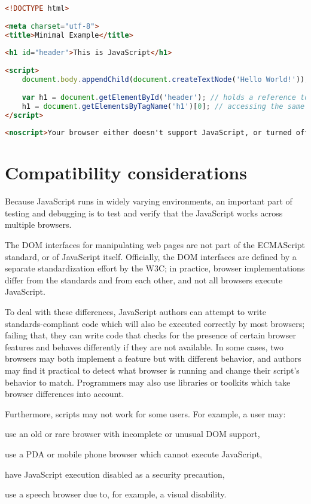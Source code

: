 \begin{lstlisting}[language=HTML]
<!DOCTYPE html>
 
<meta charset="utf-8">
<title>Minimal Example</title>
 
<h1 id="header">This is JavaScript</h1>
 
<script>
    document.body.appendChild(document.createTextNode('Hello World!'));
 
    var h1 = document.getElementById('header'); // holds a reference to the <h1> tag
    h1 = document.getElementsByTagName('h1')[0]; // accessing the same <h1> element
</script>
 
<noscript>Your browser either doesn't support JavaScript, or turned off it.</noscript>
\end{lstlisting}


\section{Compatibility considerations}

Because JavaScript runs in widely varying environments, an important part of testing and debugging is to test and verify that the JavaScript works across multiple browsers.


The DOM interfaces for manipulating web pages are not part of the ECMAScript standard, or of JavaScript itself. Officially, the DOM interfaces are defined by a separate standardization effort by the W3C; in practice, browser implementations differ from the standards and from each other, and not all browsers execute JavaScript.


To deal with these differences, JavaScript authors can attempt to write standards-compliant code which will also be executed correctly by most browsers; failing that, they can write code that checks for the presence of certain browser features and behaves differently if they are not available. In some cases, two browsers may both implement a feature but with different behavior, and authors may find it practical to detect what browser is running and change their script's behavior to match. Programmers may also use libraries or toolkits which take browser differences into account.

Furthermore, scripts may not work for some users. For example, a user may:

\begin{compactitem}
\item use an old or rare browser with incomplete or unusual DOM support,
\item use a PDA or mobile phone browser which cannot execute JavaScript,
\item have JavaScript execution disabled as a security precaution,
\item use a speech browser due to, for example, a visual disability.
\end{compactitem}

